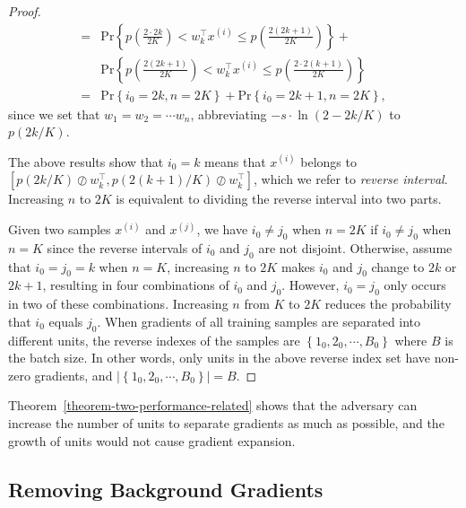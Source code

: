 \documentclass[lettersize,journal]{IEEEtran}
\begin{document}
\begin{proof}
\begin{align}
    = & \mathrm{Pr} \left\{ p\left( \frac{2\cdot2k}{2K} \right) <  w_{k}^\intercal x^{\left(i\right)} \leq  p\left( \frac{2\left( 2k+1\right)}{2K} \right) \right\} + \nonumber \\
    & \mathrm{Pr} \left\{ p\left( \frac{2\left( 2k+1\right)}{2K} \right) <  w_{k}^\intercal x^{\left(i\right)} \leq  p\left( \frac{2\cdot 2 \left( k+1\right)}{2K} \right) \right\} \nonumber \\
    = & \mathrm{Pr} \left\{i_0 = 2k, n=2K\right\} + \mathrm{Pr} \left\{i_0 = 2k+1, n=2K\right\},
\end{align}
since we set that $w_{1} = w_{2} = \cdots w_{n}$, abbreviating $- s \cdot \ln \left(2 - 2k/K \right)$ to $p\left( 2k/K\right)$.

The above results show that $i_0 = k$ means that $x^{\left(i\right)}$ belongs to $\left[ p\left( 2k/K \right) \oslash w_{k}^\intercal, p\left( 2\left( k+1 \right)/K \right) \oslash w_{k}^\intercal \right]$, which we refer to \textit{reverse interval}. Increasing $n$ to $2K$ is equivalent to dividing the reverse interval into two parts.

Given two samples $x^{\left(i\right)}$ and $x^{\left(j\right)}$, we have $i_0 \neq j_0$ when $n=2K$ if $i_0 \neq j_0$ when $n=K$ since the reverse intervals of $i_0$ and $j_0$ are not disjoint. Otherwise, assume that $i_0 = j_0 = k$ when $n=K$, increasing $n$ to $2K$ makes $i_0$ and $j_0$ change to $2k$ or $2k+1$, resulting in four combinations of $i_0$ and $j_0$. However, $i_0 = j_0$ only occurs in two of these combinations. Increasing $n$ from $K$ to $2K$ reduces the probability that $i_0$ equals $j_0$. When gradients of all training samples are separated into different units, the reverse indexes of the samples are $\left\{1_0, 2_0, \cdots, B_0 \right\}$ where $B$ is the batch size. In other words, only units in the above reverse index set have non-zero gradients, and $\left| \left\{1_0, 2_0, \cdots, B_0 \right\} \right| = B$.
\end{proof}

Theorem~\ref{theorem-two-performance-related} shows that the adversary can increase the number of units to separate gradients as much as possible, and the growth of units would not cause gradient expansion.

\subsection{Removing Background Gradients}
\label{section-removing-background}
\end{document}
